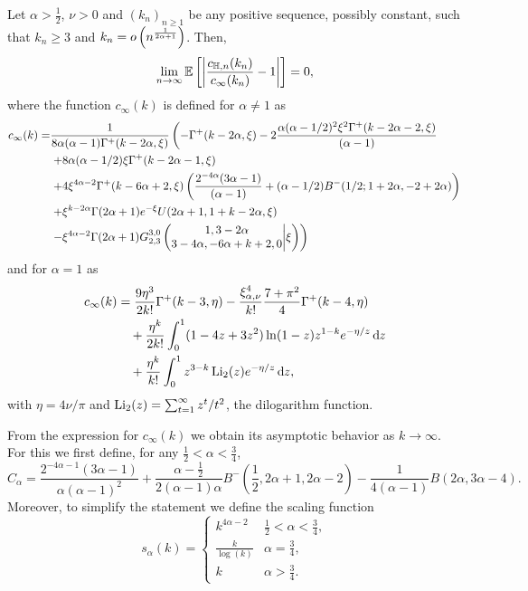 \begin{theorem}
\label{thm:local_clustering_hyperbolic}
Let $\alpha > \frac{1}{2}$, $\nu > 0$ and $(k_n)_{n \ge 1}$ be any positive sequence, possibly constant, such that $k_n \ge 3$ and $k_n = \smallO{n^{\frac{1}{2\alpha + 1}}}$. Then, 
\[
	\lim_{n \to \infty} \Exp{\left|\frac{c_{\H,n}(k_n)}{c_\infty(k_n)} - 1\right|} = 0,
\]
where the function $c_\infty(k)$ is defined for $\alpha \ne 1$ as
\begin{align*}
c_\infty(k)  =&\frac{1}{8\alpha (\alpha-1)\Gamma^+(k-2\alpha,\xi)} \left( -\Gamma^+(k - 2 \alpha, \xi) - 2\frac{\alpha (\alpha - 1/2)^2 \xi^{2} \Gamma^+(k - 2 \alpha - 2, \xi)}{(\alpha - 1)} \right. \\ 
&\left.+ 8 \alpha (\alpha - 1/2) \xi \Gamma^+(k - 2 \alpha - 1,\xi) \right.\\ 
&\left.+ 4\xi^{4\alpha - 2} \Gamma^+(k - 6 \alpha + 2, 
      \xi) \left( \frac{2^{ - 4\alpha}(3 \alpha - 1)}{(\alpha - 1)} + (\alpha - 1/2) B^-(1/2; 1 + 2 \alpha, -2 + 2 \alpha) \right)  \right.\\ 
&\left.+ \xi^{k-2\alpha} \Gamma(2\alpha+1)e^{-\xi} U(2\alpha+1,1+k-2\alpha,\xi) \right. \\ 
&\left.- \xi^{4\alpha-2} \Gamma(2\alpha+1)\MeijerG{3}{0}{2}{3}{1,3-2\alpha}{3-4\alpha,-6\alpha+k+2,0}{\xi}  \right)
\end{align*}
and for $\alpha = 1$ as
\begin{align*}
	c_\infty(k) &= \frac{9 \eta^3}{2 k!} 	
		\Gamma^+(k-3,\eta)-\frac{\xi_{\alpha,\nu}^4}{k!}\frac{7+\pi^2}{4}\Gamma^+(k-4,\eta)\\
	&\hspace{10pt}+ \frac{\eta^k}{2k!}\int_0^1 (1-4z+3z^2)\ln(1-z)z^{1-k}e^{-\eta/z}\dd z\\ 
	&\hspace{10pt}+ \frac{\eta^k}{k!}\int_0^1 z^{3-k} \Li_2(z) e^{-\eta/z} \dd z,
\end{align*}
with $\eta = 4\nu/\pi$ and $\Li_2(z) = \sum_{t = 1}^\infty z^t/t^2$, the dilogarithm function.
\end{theorem}

From the expression for $c_\infty(k)$ we obtain its asymptotic behavior as $k \to \infty$. For this we first define, for any $\frac{1}{2} < \alpha < \frac{3}{4}$,
\begin{equation}\label{eq:def_C_alpha}
	C_\alpha = \frac{2^{-4\alpha - 1}(3\alpha - 1)}{\alpha(\alpha-1)^2} 
	+ \frac{\alpha - \frac{1}{2}}{2(\alpha - 1)\alpha} B^-(\frac{1}{2},2\alpha + 1, 2\alpha - 2)
	- \frac{1}{4(\alpha - 1)}B(2\alpha, 3\alpha - 4).
\end{equation}
Moreover, to simplify the statement we define the scaling function 
\begin{equation}\label{eq:def_scaling_function}
s_\alpha(k) = \begin{cases} 
		k^{4\alpha-2} &\frac{1}{2}<\alpha<\frac{3}{4}, \\
		\frac{k}{\log(k)} & \alpha = \frac{3}{4}, \\
		k &\alpha > \frac{3}{4}.
\end{cases}
\end{equation}

